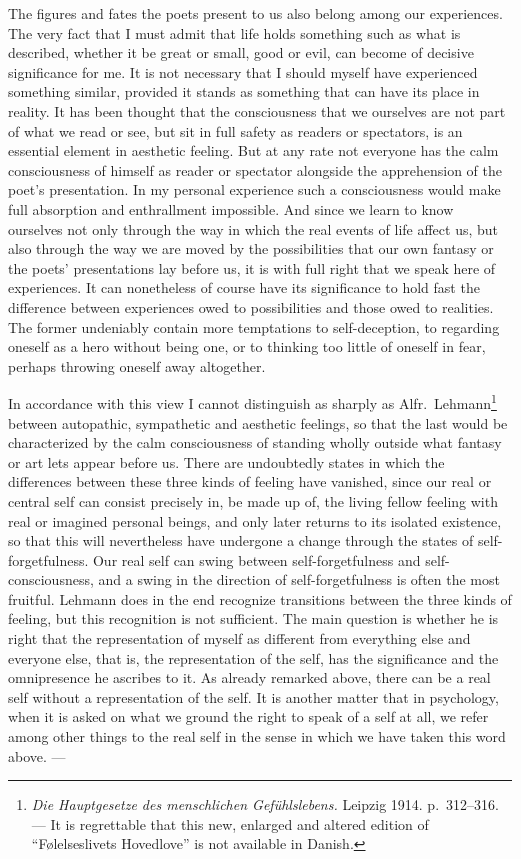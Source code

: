 \documentclass[12pt]{book}
\newcommand{\opage}[1]{\marginnote{\footnotesize\textit{[#1]}}}
\begin{document}
The figures and fates the poets present to us also belong among our experiences.
The very fact that I must admit that life holds something such as what is
described, whether it be great or small, good or evil, can become of decisive
significance for me. It is not necessary that I should myself have experienced
something similar, provided it stands as something that can have its place in
reality. It has been thought that the consciousness that we ourselves are not
part of what we read or see, but sit in full safety as readers or spectators, is
an essential element in aesthetic feeling. But at any rate not everyone has the
calm consciousness of himself as reader or spectator alongside the apprehension
of the poet's presentation. In my personal experience such a consciousness would
make full absorption and enthrallment impossible. And since we learn to know
ourselves not only through the way in which the real events of life affect us,
but also through the way we are moved by the possibilities that our own fantasy
or the poets' presentations lay before us, it is with full right that we speak
here of experiences. It can nonetheless of course have its significance to hold
fast the difference between experiences owed to possibilities and those owed to
realities. The former undeniably contain more temptations to self-deception, to
regarding oneself as a hero without being one, or to thinking too little of
oneself in fear, perhaps throwing oneself away altogether.

In accordance with this view I cannot distinguish as sharply as Alfr.\
Lehmann\footnote{\textit{Die Hauptgesetze des menschlichen Gefühlslebens.}
Leipzig 1914. p.~312--316. --- It is regrettable that this new, enlarged and
altered edition of ``Følelseslivets Hovedlove'' is not available in Danish.}
between autopathic, sympathetic and \opage{23}aesthetic feelings, so that the
last would be characterized by the calm consciousness of standing wholly outside
what fantasy or art lets appear before us. There are undoubtedly states in which
the differences between these three kinds of feeling have vanished, since our
real or central self can consist precisely in, be made up of, the living fellow
feeling with real or imagined personal beings, and only later returns to its
isolated existence, so that this will nevertheless have undergone a change
through the states of self-forgetfulness. Our real self can swing between
self-forgetfulness and self-consciousness, and a swing in the direction of
self-forgetfulness is often the most fruitful. Lehmann does in the end recognize
transitions between the three kinds of feeling, but this recognition is not
sufficient. The main question is whether he is right that the representation of
myself as different from everything else and everyone else, that is, the
representation of the self, has the significance and the omnipresence he
ascribes to it. As already remarked above, there can be a real self without a
representation of the self. It is another matter that in psychology, when it is
asked on what we ground the right to speak of a self at all, we refer among other
things to the real self in the sense in which we have taken this word above. ---
\end{document}
